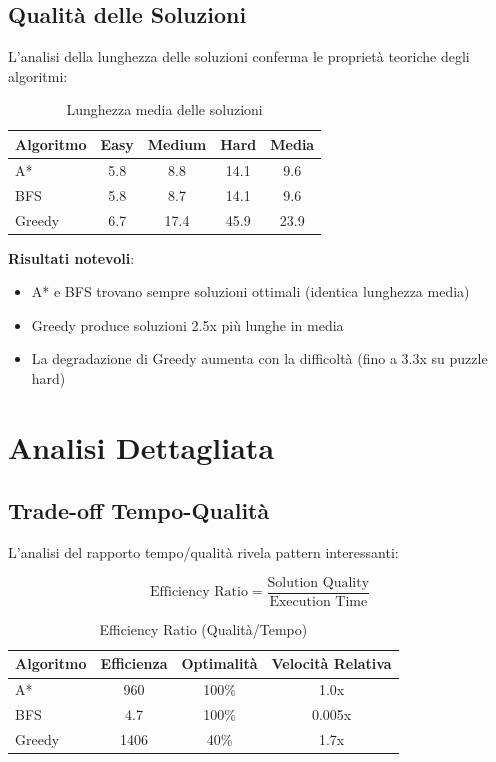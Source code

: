 \documentclass[12pt,a4paper]{report}
\theoremstyle{definition}
\begin{document}
\subsection{Qualità delle Soluzioni}

L'analisi della lunghezza delle soluzioni conferma le proprietà teoriche degli algoritmi:

\begin{table}[H]
\centering
\caption{Lunghezza media delle soluzioni}
\begin{tabular}{|l|c|c|c|c|}
\hline
\textbf{Algoritmo} & \textbf{Easy} & \textbf{Medium} & \textbf{Hard} & \textbf{Media} \\
\hline
A* & 5.8 & 8.8 & 14.1 & 9.6 \\
BFS & 5.8 & 8.7 & 14.1 & 9.6 \\
Greedy & 6.7 & 17.4 & 45.9 & 23.9 \\
\hline
\end{tabular}
\end{table}

\textbf{Risultati notevoli}:

\begin{itemize}
    \item A* e BFS trovano sempre soluzioni ottimali (identica lunghezza media)
    \item Greedy produce soluzioni 2.5x più lunghe in media
    \item La degradazione di Greedy aumenta con la difficoltà (fino a 3.3x su puzzle hard)
\end{itemize}

\section{Analisi Dettagliata}

\subsection{Trade-off Tempo-Qualità}

L'analisi del rapporto tempo/qualità rivela pattern interessanti:

\begin{equation}
\text{Efficiency Ratio} = \frac{\text{Solution Quality}}{\text{Execution Time}}
\end{equation}

\begin{table}[H]
\centering
\caption{Efficiency Ratio (Qualità/Tempo)}
\begin{tabular}{|l|c|c|c|}
\hline
\textbf{Algoritmo} & \textbf{Efficienza} & \textbf{Optimalità} & \textbf{Velocità Relativa} \\
\hline
A* & 960 & 100\% & 1.0x \\
BFS & 4.7 & 100\% & 0.005x \\
Greedy & 1406 & 40\% & 1.7x \\
\hline
\end{tabular}
\end{table}
\end{document}
